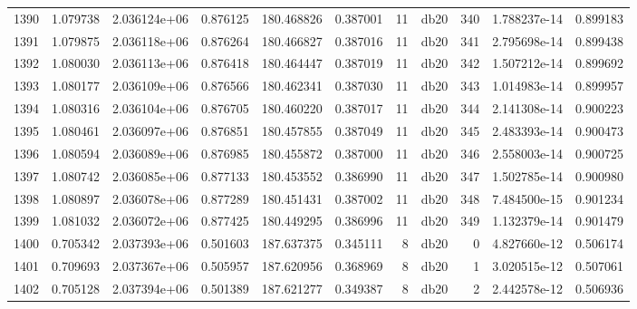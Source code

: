 \begin{tabular}{lrrrrrrlrrr}
1390 &    1.079738 &        2.036124e+06 &  0.876125 &              180.468826 &    0.387001 &      11 &         db20 &    340 &   1.788237e-14 &      0.899183 \\
1391 &    1.079875 &        2.036118e+06 &  0.876264 &              180.466827 &    0.387016 &      11 &         db20 &    341 &   2.795698e-14 &      0.899438 \\
1392 &    1.080030 &        2.036113e+06 &  0.876418 &              180.464447 &    0.387019 &      11 &         db20 &    342 &   1.507212e-14 &      0.899692 \\
1393 &    1.080177 &        2.036109e+06 &  0.876566 &              180.462341 &    0.387030 &      11 &         db20 &    343 &   1.014983e-14 &      0.899957 \\
1394 &    1.080316 &        2.036104e+06 &  0.876705 &              180.460220 &    0.387017 &      11 &         db20 &    344 &   2.141308e-14 &      0.900223 \\
1395 &    1.080461 &        2.036097e+06 &  0.876851 &              180.457855 &    0.387049 &      11 &         db20 &    345 &   2.483393e-14 &      0.900473 \\
1396 &    1.080594 &        2.036089e+06 &  0.876985 &              180.455872 &    0.387000 &      11 &         db20 &    346 &   2.558003e-14 &      0.900725 \\
1397 &    1.080742 &        2.036085e+06 &  0.877133 &              180.453552 &    0.386990 &      11 &         db20 &    347 &   1.502785e-14 &      0.900980 \\
1398 &    1.080897 &        2.036078e+06 &  0.877289 &              180.451431 &    0.387002 &      11 &         db20 &    348 &   7.484500e-15 &      0.901234 \\
1399 &    1.081032 &        2.036072e+06 &  0.877425 &              180.449295 &    0.386996 &      11 &         db20 &    349 &   1.132379e-14 &      0.901479 \\
1400 &    0.705342 &        2.037393e+06 &  0.501603 &              187.637375 &    0.345111 &       8 &         db20 &      0 &   4.827660e-12 &      0.506174 \\
1401 &    0.709693 &        2.037367e+06 &  0.505957 &              187.620956 &    0.368969 &       8 &         db20 &      1 &   3.020515e-12 &      0.507061 \\
1402 &    0.705128 &        2.037394e+06 &  0.501389 &              187.621277 &    0.349387 &       8 &         db20 &      2 &   2.442578e-12 &      0.506936 \\

\end{tabular}
